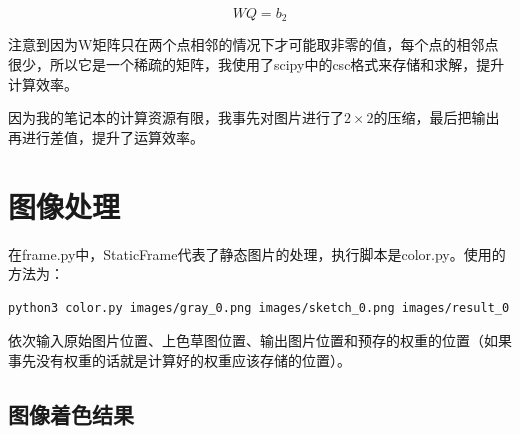 \documentclass{article}
\begin{document}
\begin{equation}
WQ = b_2
\end{equation}

注意到因为W矩阵只在两个点相邻的情况下才可能取非零的值，每个点的相邻点很少，所以它是一个稀疏的矩阵，我使用了scipy中的csc格式来存储和求解，提升计算效率。

因为我的笔记本的计算资源有限，我事先对图片进行了$2\times 2$的压缩，最后把输出再进行差值，提升了运算效率。


\section{图像处理}
在frame.py中，StaticFrame代表了静态图片的处理，执行脚本是color.py。使用的方法为：

\begin{lstlisting}[language=bash]
 python3 color.py images/gray_0.png images/sketch_0.png images/result_0.png images/weights/0.pickle
\end{lstlisting}

依次输入原始图片位置、上色草图位置、输出图片位置和预存的权重的位置（如果事先没有权重的话就是计算好的权重应该存储的位置）。

\subsection{图像着色结果}
\end{document}
